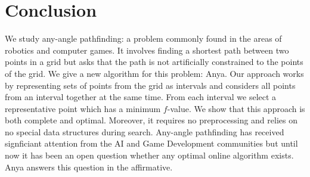 \section{Conclusion}
We study any-angle pathfinding: a problem commonly found in the areas of
robotics and computer games. It involves finding a shortest path between two
points in a grid but asks that the path is not artificially constrained to the
points of the grid.  We give a new algorithm for this problem: Anya.  Our
approach works by representing sets of points from the grid as intervals and
considers all points from an interval together at the same time. From each
interval we select a representative point which has a minimum $f$-value. We show
that this approach is both complete and optimal. Moreover, it requires no
preprocessing and relies on no special data structures during search.  Any-angle
pathfinding has received signficiant attention from the AI and Game Development
communities but until now it has been an open question whether any optimal
online algorithm exists. Anya answers this question in the affirmative.
